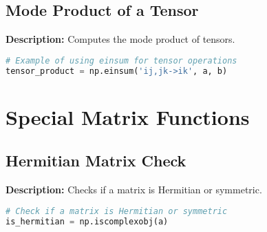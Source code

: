 \documentclass[a4paper, 12pt]{article}
\begin{document}
\subsection{Mode Product of a Tensor}
\textbf{Description:} Computes the mode product of tensors.

\begin{lstlisting}[language=Python]
# Example of using einsum for tensor operations
tensor_product = np.einsum('ij,jk->ik', a, b)
\end{lstlisting}

\section{Special Matrix Functions}

\subsection{Hermitian Matrix Check}
\textbf{Description:} Checks if a matrix is Hermitian or symmetric.

\begin{lstlisting}[language=Python]
# Check if a matrix is Hermitian or symmetric
is_hermitian = np.iscomplexobj(a)
\end{lstlisting}
\end{document}
